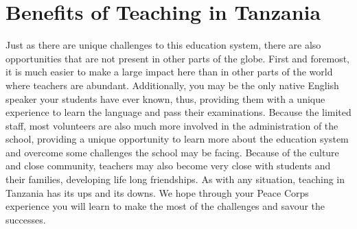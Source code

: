 \begin{center}
\setlength\fboxsep{0pt}
\setlength\fboxrule{2pt}
\end{center}

\section{Benefits of Teaching in Tanzania	}
Just as there are unique challenges to this education system, there are also opportunities that are not present in other parts of the globe.  First and foremost, it is much easier to make a large impact here than in other parts of the world where teachers are abundant. Additionally, you may be the only native English speaker your students have ever known, thus, providing them with a unique experience to learn the language and pass their examinations.  Because the limited staff, most volunteers are also much more involved in the administration of the school, providing a unique opportunity to learn more about the education system and overcome some challenges the school may be facing.  Because of the culture and close community, teachers may also become very close with students and their families, developing life long friendships.  As with any situation, teaching in Tanzania has its ups and its downs.  We hope through your Peace Corps experience you will learn to make the most of the challenges and savour the successes.  

